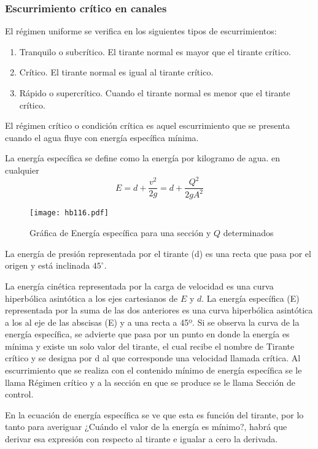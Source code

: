 \subsubsection{Escurrimiento crítico en canales}
El régimen uniforme se verifica en los siguientes tipos de escurrimientos:
\begin{enumerate}
    \item Tranquilo o subcrítico. El tirante normal es mayor que el tirante crítico.
    \item Crítico. El tirante normal es igual al tirante crítico.
    \item Rápido o supercrítico. Cuando el tirante normal es menor que el tirante crítico.
\end{enumerate}
El régimen crítico o condición crítica es aquel escurrimiento que se presenta cuando el agua fluye con energía específica mínima.

La energía específica se define como la energía por kilogramo de agua. en cualquier
\begin{equation}
    E =d + \frac{v^2}{2g} = d + \frac{Q^2}{2gA^2}
\end{equation}
\begin{figure}[h!]
\centering
  \texttt{[image: hb116.pdf]}
  \caption{Gráfica de Energía específica para una sección y $Q$ determinados}
  \label{hb116}
\end{figure}
La energía de presión representada por el tirante (d) es una recta que pasa por el origen y está inclinada $45^{\circ}$.

La energía cinética representada por la carga de velocidad es una curva hiperbólica asintótica a los ejes cartesianos de $E$ y $d$. La energía específica (E) representada por la suma de las dos anteriores es una curva hiperbólica asintótica a los al eje de las abscisas (E) y a una recta a 45º. Si se observa la curva de la energía específica, se advierte que pasa por un punto en donde la energía es mínima y existe un solo valor del tirante, el cual recibe el nombre de Tirante crítico y se designa por d al que corresponde una velocidad llamada crítica. Al escurrimiento que se realiza con el contenido mínimo de energía específica se le llama Régimen crítico y a la sección en que se produce se le llama Sección de control.

En la ecuación de energía específica se ve que esta es función del tirante, por lo tanto para averiguar ¿Cuándo el valor de la energía es mínimo?, habrá que derivar esa expresión con respecto al tirante e igualar a cero la derivada.

